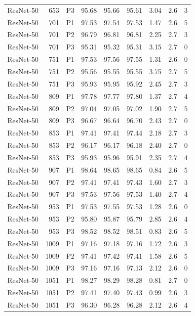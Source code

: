 {\begin{longtable}{lrlrrrrrr}
ResNet-50 & 653 & P3 & 95.68 & 95.66 & 95.61 & 3.04 & 2.6 & 3 \\
ResNet-50 & 701 & P1 & 97.53 & 97.54 & 97.53 & 1.47 & 2.6 & 5 \\
ResNet-50 & 701 & P2 & 96.79 & 96.81 & 96.81 & 2.25 & 2.7 & 3 \\
ResNet-50 & 701 & P3 & 95.31 & 95.32 & 95.31 & 3.15 & 2.7 & 0 \\
ResNet-50 & 751 & P1 & 97.53 & 97.56 & 97.55 & 1.31 & 2.6 & 0 \\
ResNet-50 & 751 & P2 & 95.56 & 95.55 & 95.55 & 3.75 & 2.7 & 5 \\
ResNet-50 & 751 & P3 & 95.93 & 95.95 & 95.92 & 2.45 & 2.7 & 3 \\
ResNet-50 & 809 & P1 & 97.78 & 97.77 & 97.80 & 1.37 & 2.7 & 4 \\
ResNet-50 & 809 & P2 & 97.04 & 97.05 & 97.02 & 1.90 & 2.7 & 5 \\
ResNet-50 & 809 & P3 & 96.67 & 96.64 & 96.70 & 2.43 & 2.7 & 0 \\
ResNet-50 & 853 & P1 & 97.41 & 97.41 & 97.44 & 2.18 & 2.7 & 3 \\
ResNet-50 & 853 & P2 & 96.17 & 96.17 & 96.18 & 2.40 & 2.7 & 0 \\
ResNet-50 & 853 & P3 & 95.93 & 95.96 & 95.91 & 2.35 & 2.7 & 4 \\
ResNet-50 & 907 & P1 & 98.64 & 98.65 & 98.65 & 0.84 & 2.6 & 5 \\
ResNet-50 & 907 & P2 & 97.41 & 97.41 & 97.43 & 1.60 & 2.7 & 3 \\
ResNet-50 & 907 & P3 & 97.53 & 97.56 & 97.53 & 1.40 & 2.7 & 4 \\
ResNet-50 & 953 & P1 & 97.53 & 97.55 & 97.53 & 1.28 & 2.6 & 0 \\
ResNet-50 & 953 & P2 & 95.80 & 95.87 & 95.79 & 2.85 & 2.6 & 4 \\
ResNet-50 & 953 & P3 & 98.52 & 98.52 & 98.51 & 0.83 & 2.6 & 5 \\
ResNet-50 & 1009 & P1 & 97.16 & 97.18 & 97.16 & 1.72 & 2.6 & 3 \\
ResNet-50 & 1009 & P2 & 97.41 & 97.42 & 97.41 & 1.58 & 2.6 & 5 \\
ResNet-50 & 1009 & P3 & 97.16 & 97.16 & 97.13 & 2.12 & 2.6 & 0 \\
ResNet-50 & 1051 & P1 & 98.27 & 98.29 & 98.28 & 0.81 & 2.7 & 0 \\
ResNet-50 & 1051 & P2 & 97.41 & 97.40 & 97.43 & 0.99 & 2.6 & 3 \\
ResNet-50 & 1051 & P3 & 96.30 & 96.28 & 96.28 & 2.12 & 2.6 & 4 \\

\end{longtable}}
